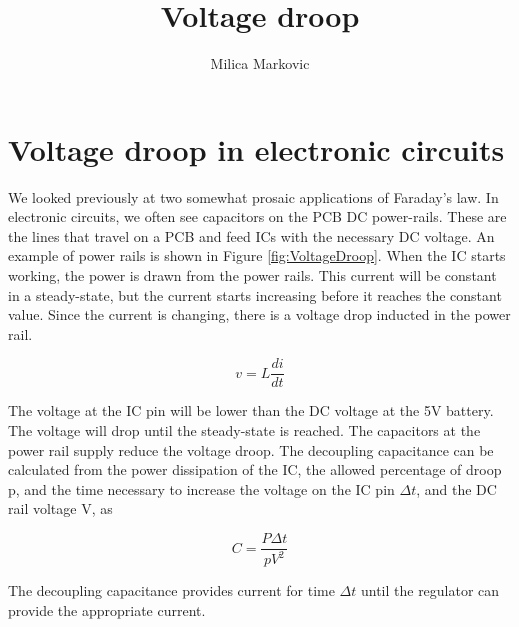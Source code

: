\documentclass{ximera}
\title{Voltage droop}
\author{Milica Markovic}
\begin{document}
  
\begin{abstract}  

\end{abstract}  
\maketitle    



\section{Voltage droop in electronic circuits}


We looked previously at two somewhat prosaic applications of Faraday's law. In electronic circuits, we often see capacitors on the PCB DC power-rails. These are the lines that travel on a PCB and feed ICs with the necessary DC voltage. An example of power rails is shown in Figure \ref{fig:VoltageDroop}. When the IC starts working, the power is drawn from the power rails. This current will be constant in a steady-state, but the current starts increasing before it reaches the constant value. Since the current is changing, there is a voltage drop inducted in the power rail. 

\begin{equation}
v=L \frac{di}{dt}
\end{equation}

The voltage at the IC pin will be lower than the DC voltage at the 5V battery. The voltage will drop until the steady-state is reached. The capacitors at the power rail supply reduce the voltage droop. The decoupling capacitance can be calculated from the power dissipation of the IC, the allowed percentage of droop p, and the time necessary to increase the voltage on the IC pin $\Delta t$, and the DC rail voltage V, as

\begin{equation}
C=\frac{P \Delta t}{p V^2} 
\end{equation}

The decoupling capacitance provides current for time $\Delta t$ until the regulator can provide the appropriate current.
\end{document}
